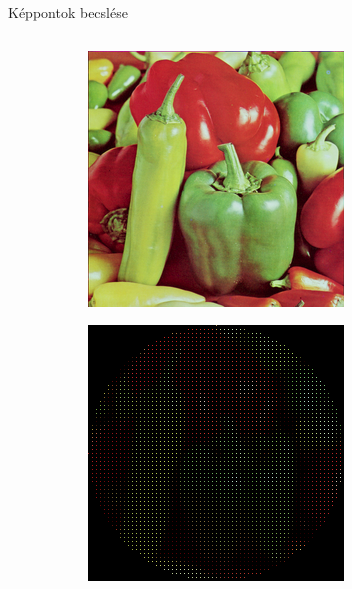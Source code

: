 \documentclass{beamer}
\begin{document}
\begin{frame}{Képpontok becslése}

\begin{columns}
    \begin{column}{0.5\textwidth}
        \begin{figure}
            \begin{subfigure}{.48\textwidth}
                \centering
            \includegraphics[width=\textwidth]{figures/pepper_color_256.png}
            \end{subfigure}
            \begin{subfigure}{.48\textwidth}
                \centering
            \includegraphics[width=\textwidth]{figures/pepper_square.png}

\end{subfigure}
\end{figure}
\end{column}
\end{columns}
\end{frame}
\end{document}
